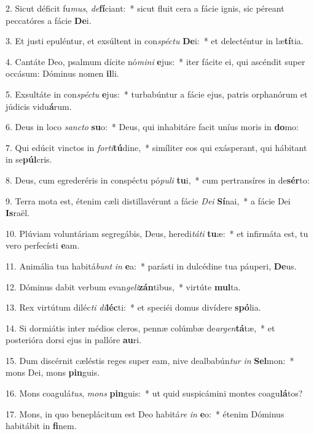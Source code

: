 2. Sicut déficit fu\textit{mus}, \textit{de}\textbf{fí}ciant:~*  sicut fluit cera a fácie ignis, sic péreant peccatóres a fácie \textbf{De}i.\

3. Et justi epuléntur, et exsúltent in con\textit{spéc}\textit{tu} \textbf{De}i:~*  et delecténtur in læ\textbf{tí}tia.\

4. Cantáte Deo, psalmum dícite nó\textit{mi}\textit{ni} \textbf{e}jus:~*  iter fácite ei, qui ascéndit super occásum: Dóminus nomen \textbf{il}li.\

5. Exsultáte in con\textit{spéc}\textit{tu} \textbf{e}jus:~*  turbabúntur a fácie ejus, patris orphanórum et júdicis vidu\textbf{á}rum.\

6. Deus in loco \textit{sanc}\textit{to} \textbf{su}o:~*  Deus, qui inhabitáre facit uníus moris in \textbf{do}mo:\

7. Qui edúcit vinctos in \textit{for}\textit{ti}\textbf{tú}dine,~*  simíliter eos qui exásperant, qui hábitant in se\textbf{púl}cris.\

8. Deus, cum egrederéris in conspéctu pó\textit{pu}\textit{li} \textbf{tu}i,~*  cum pertransíres in de\textbf{sér}to:\

9. Terra mota est, étenim cæli distillavérunt a fácie \textit{De}\textit{i} \textbf{Sí}nai,~*  a fácie Dei \textbf{Is}raël.\

10. Plúviam voluntáriam segregábis, Deus, heredi\textit{tá}\textit{ti} \textbf{tu}æ:~*  et infirmáta est, tu vero perfecísti \textbf{e}am.\

11. Animália tua habitá\textit{bunt} \textit{in} \textbf{e}a:~*  parásti in dulcédine tua páuperi, \textbf{De}us.\

12. Dóminus dabit verbum evan\textit{ge}\textit{li}\textbf{zán}tibus,~*  virtúte \textbf{mul}ta.\

13. Rex virtútum diléc\textit{ti} \textit{di}\textbf{léc}ti:~*  et speciéi domus divídere \textbf{spó}lia.\

14. Si dormiátis inter médios cleros, pennæ colúmbæ de\textit{ar}\textit{gen}\textbf{tá}tæ,~*  et posterióra dorsi ejus in pallóre \textbf{au}ri.\

15. Dum discérnit cæléstis reges super eam, nive dealbabún\textit{tur} \textit{in} \textbf{Sel}mon:~*  mons Dei, mons \textbf{pin}guis.\

16. Mons coagulá\textit{tus}, \textit{mons} \textbf{pin}guis:~*  ut quid suspicámini montes coagu\textbf{lá}tos?\

17. Mons, in quo beneplácitum est Deo habitá\textit{re} \textit{in} \textbf{e}o:~*  étenim Dóminus habitábit in \textbf{fi}nem.\


